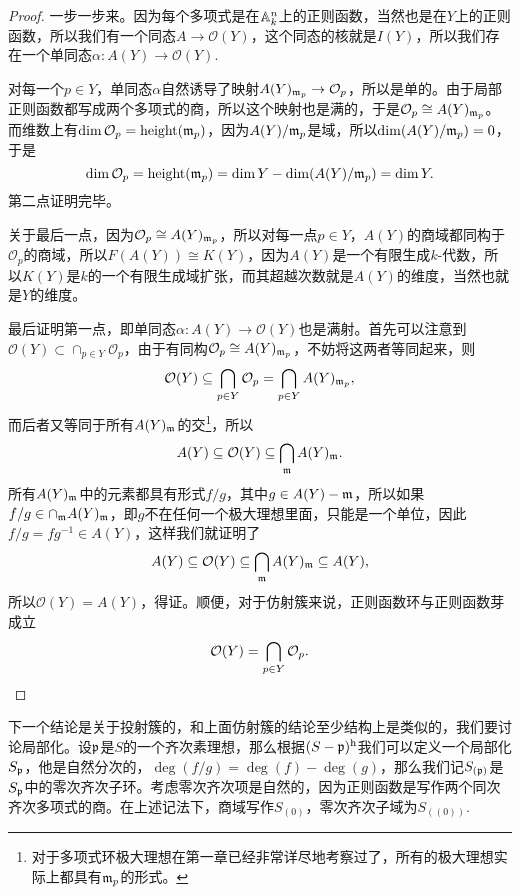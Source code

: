 \documentclass[9pt]{extarticle}
\theoremstyle{plain}%
\begin{document}
\begin{proof}
	一步一步来。因为每个多项式是在$\mathbb{A}^n_k$上的正则函数，当然也是在$Y$上的正则函数，所以我们有一个同态$A\to \mathcal{O}(Y)$，这个同态的核就是$I(Y)$，所以我们存在一个单同态$\alpha: A(Y)\to\mathcal{O}(Y)$.

	对每一个$p\in Y$，单同态$\alpha$自然诱导了映射$A(Y)_{\mathfrak{m}_p}\to \mathcal{O}_p$，所以是单的。由于局部正则函数都写成两个多项式的商，所以这个映射也是满的，于是$\mathcal{O}_p\cong A(Y)_{\mathfrak{m}_p}$。而维数上有$\dim \mathcal{O}_p=\operatorname{height}(\mathfrak{m}_p)$，因为$A(Y)/\mathfrak{m}_p$是域，所以$\dim (A(Y)/\mathfrak{m}_p)=0$，于是
	\[
		\dim \mathcal{O}_p=\operatorname{height}(\mathfrak{m}_p)=\dim Y-\dim (A(Y)/\mathfrak{m}_p)=\dim Y.
	\]
	第二点证明完毕。

	关于最后一点，因为$\mathcal{O}_p\cong A(Y)_{\mathfrak{m}_p}$，所以对每一点$p\in Y$，$A(Y)$的商域都同构于$\mathcal{O}_p$的商域，所以$F(A(Y))\cong K(Y)$，因为$A(Y)$是一个有限生成$k$-代数，所以$K(Y)$是$k$的一个有限生成域扩张，而其超越次数就是$A(Y)$的维度，当然也就是$Y$的维度。

	最后证明第一点，即单同态$\alpha: A(Y)\to\mathcal{O}(Y)$也是满射。首先可以注意到$\mathcal{O}(Y)\subset \cap_{p\in Y}\mathcal{O}_p$，由于有同构$\mathcal{O}_p\cong A(Y)_{\mathfrak{m}_p}$，不妨将这两者等同起来，则
	\[
		\mathcal{O}(Y)\subseteq \bigcap_{p\in Y}\mathcal{O}_p=\bigcap_{p\in Y}A(Y)_{\mathfrak{m}_p},
	\]
	而后者又等同于所有$A(Y)_{\mathfrak{m}}$的交\footnote{对于多项式环极大理想在第一章已经非常详尽地考察过了，所有的极大理想实际上都具有$\mathfrak{m}_p$的形式。}，所以
	\[
		A(Y)\subseteq \mathcal{O}(Y)\subseteq \bigcap_{\mathfrak{m}}A(Y)_{\mathfrak{m}}.
	\]
	所有$A(Y)_{\mathfrak{m}}$中的元素都具有形式$f/g$，其中$g\in A(Y)-\mathfrak{m}$，所以如果$f/g\in \cap_{\mathfrak{m}}A(Y)_{\mathfrak{m}}$，即$g$不在任何一个极大理想里面，只能是一个单位，因此$f/g=fg^{-1}\in A(Y)$，这样我们就证明了
	\[
		A(Y)\subseteq \mathcal{O}(Y)\subseteq \bigcap_{\mathfrak{m}}A(Y)_{\mathfrak{m}}\subseteq A(Y),
	\]
	所以$\mathcal{O}(Y)=A(Y)$，得证。顺便，对于仿射簇来说，正则函数环与正则函数芽成立
	\[
		\mathcal{O}(Y)=\bigcap_{p\in Y}\mathcal{O}_{p}.
	\]
\end{proof}

下一个结论是关于投射簇的，和上面仿射簇的结论至少结构上是类似的，我们要讨论局部化。设$\mathfrak{p}$是$S$的一个齐次素理想，那么根据$(S-\mathfrak{p})^{\mathrm{h}}$我们可以定义一个局部化$S_{\mathfrak{p}}$，他是自然分次的，$\deg(f/g)=\deg (f)-\deg (g)$，那么我们记$S_{(\mathfrak{p})}$是$S_{\mathfrak{p}}$中的零次齐次子环。考虑零次齐次项是自然的，因为正则函数是写作两个同次齐次多项式的商。在上述记法下，商域写作$S_{(0)}$，零次齐次子域为$S_{((0))}$.
\end{document}

